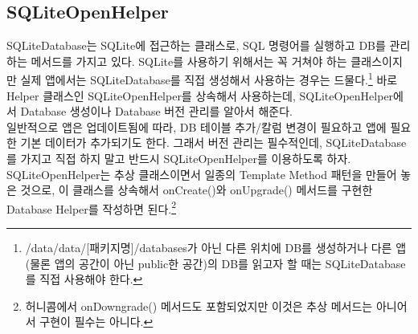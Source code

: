 
    
\begin{comment}
인덱스 문제가 있거나 테이블 조인 구조가 복잡하다면 쿼리 튜닝이 필요할 수 있다. EXPLAIN PLAN을 쓰는 방법이나 튜닝에 대한 기본 내용들은 인터넷에 많이 찾아 볼 수 있다.\\

09-05 18:47:27.335: E/Database(13396): close() was never explicitly called on database '/data/data/com.nhn.android.alarmclock/databases/alarms.db' 
09-05 18:47:27.335: E/Database(13396): android.database.sqlite.DatabaseObjectNotClosedException: Application did not close the cursor or database object that was opened here
09-05 18:47:27.335: E/Database(13396): 	at android.database.sqlite.SQLiteDatabase.<init>(SQLiteDatabase.java:1847)
09-05 18:47:27.335: E/Database(13396): 	at android.database.sqlite.SQLiteDatabase.openDatabase(SQLiteDatabase.java:820)
09-05 18:47:27.335: E/Database(13396): 	at android.database.sqlite.SQLiteDatabase.openOrCreateDatabase(SQLiteDatabase.java:854)
09-05 18:47:27.335: E/Database(13396): 	at android.database.sqlite.SQLiteDatabase.openOrCreateDatabase(SQLiteDatabase.java:847)
09-05 18:47:27.335: E/Database(13396): 	at android.app.ContextImpl.openOrCreateDatabase(ContextImpl.java:640)
09-05 18:47:27.335: E/Database(13396): 	at android.content.ContextWrapper.openOrCreateDatabase(ContextWrapper.java:203)
09-05 18:47:27.335: E/Database(13396): 	at android.database.sqlite.SQLiteOpenHelper.getWritableDatabase(SQLiteOpenHelper.java:118)
\end{comment}

\subsection{SQLiteOpenHelper}
SQLiteDatabase는 SQLite에 접근하는 클래스로, SQL 명령어를 실행하고 DB를 관리하는 메서드를 가지고 있다. SQLite를 사용하기 위해서는 꼭 거쳐야 하는 클래스이지만 실제 앱에서는 SQLiteDatabase를 직접 생성해서 사용하는 경우는 드물다.\footnote{/data/data/[패키지명]/databases가 아닌 다른 위치에 DB를 생성하거나 다른 앱(물론 앱의 공간이 아닌 public한 공간)의 DB를 읽고자 할 때는 SQLiteDatabase를 직접 사용해야 한다.}
바로 Helper 클래스인 SQLiteOpenHelper를 상속해서 사용하는데, SQLiteOpenHelper에서 Database 생성이나 Database 버전 관리를 알아서 해준다.\\

일반적으로 앱은 업데이트됨에 따라, DB 테이블 추가/칼럼 변경이 필요하고 앱에 필요한 기본 데이터가 추가되기도 한다. 그래서 버전 관리는 필수적인데, SQLiteDatabase를 가지고 직접 하지 말고 반드시 SQLiteOpenHelper를 이용하도록 하자.
SQLiteOpenHelper는 추상 클래스이면서 일종의 Template Method 패턴을 만들어 놓은 것으로, 이 클래스를 상속해서 onCreate()와 onUpgrade() 메서드를 구현한 Database Helper를 작성하면 된다.\footnote{허니콤에서 onDowngrade() 메서드도 포함되었지만 이것은 추상 메서드는 아니어서 구현이 필수는 아니다.}\\

